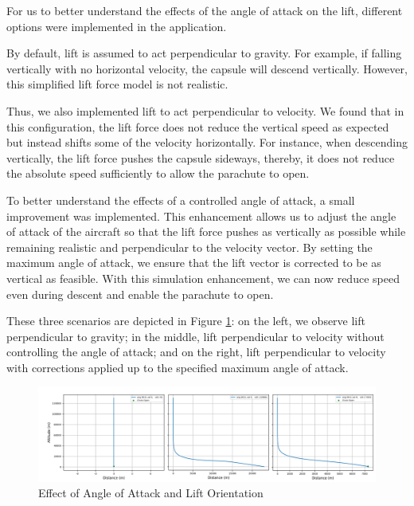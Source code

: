 \documentclass[runningheads]{llncs}
\begin{document}
For us to better understand the effects of the angle of attack on the lift, different options were implemented in the application. 

By default, lift is assumed to act perpendicular to gravity. For example, if falling vertically with no horizontal velocity, the capsule will descend vertically. However, this simplified lift force model is not realistic.

Thus, we also implemented lift to act perpendicular to velocity. We found that in this configuration, the lift force does not reduce the vertical speed as expected but instead shifts some of the velocity horizontally. For instance, when descending vertically, the lift force pushes the capsule sideways, thereby, it does not reduce the absolute speed sufficiently to allow the parachute to open.

To better understand the effects of a controlled angle of attack, a small improvement was implemented. This enhancement allows us to adjust the angle of attack of the aircraft so that the lift force pushes as vertically as possible while remaining realistic and perpendicular to the velocity vector. By setting the maximum angle of attack, we ensure that the lift vector is corrected to be as vertical as feasible. With this simulation enhancement, we can now reduce speed even during descent and enable the parachute to open.

These three scenarios are depicted in Figure \ref{lift_vs_attack_angle}: on the left, we observe lift perpendicular to gravity; in the middle, lift perpendicular to velocity without controlling the angle of attack; and on the right, lift perpendicular to velocity with corrections applied up to the specified maximum angle of attack.

\begin{figure}[ht]
    \centering
    \includegraphics[width=1\textwidth]{images/lift_vs_attack_angle.png}
    \caption{Effect of Angle of Attack and Lift Orientation} \label{lift_vs_attack_angle}
\end{figure}
\end{document}
